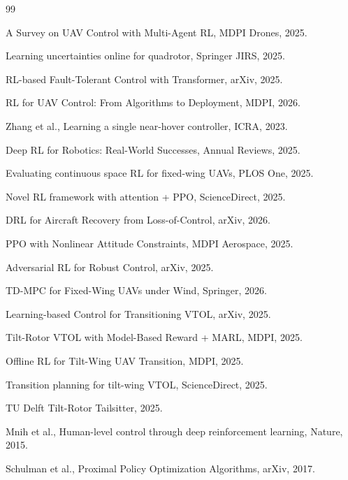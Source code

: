 \documentclass[12pt,a4paper]{ctexart}
\begin{document}
\begin{thebibliography}{99}

 A Survey on UAV Control with Multi-Agent RL, MDPI Drones, 2025.

 Learning uncertainties online for quadrotor, Springer JIRS, 2025.

 RL-based Fault-Tolerant Control with Transformer, arXiv, 2025.

 RL for UAV Control: From Algorithms to Deployment, MDPI, 2026.

 Zhang et al., Learning a single near-hover controller, ICRA, 2023.

 Deep RL for Robotics: Real-World Successes, Annual Reviews, 2025.

 Evaluating continuous space RL for fixed-wing UAVs, PLOS One, 2025.

 Novel RL framework with attention + PPO, ScienceDirect, 2025.

 DRL for Aircraft Recovery from Loss-of-Control, arXiv, 2026.

 PPO with Nonlinear Attitude Constraints, MDPI Aerospace, 2025.

 Adversarial RL for Robust Control, arXiv, 2025.

 TD-MPC for Fixed-Wing UAVs under Wind, Springer, 2026.

 Learning-based Control for Transitioning VTOL, arXiv, 2025.

 Tilt-Rotor VTOL with Model-Based Reward + MARL, MDPI, 2025.

 Offline RL for Tilt-Wing UAV Transition, MDPI, 2025.

 Transition planning for tilt-wing VTOL, ScienceDirect, 2025.

 TU Delft Tilt-Rotor Tailsitter, 2025.

 Mnih et al., Human-level control through deep reinforcement learning, Nature, 2015.

 Schulman et al., Proximal Policy Optimization Algorithms, arXiv, 2017.


\end{thebibliography}
\end{document}
